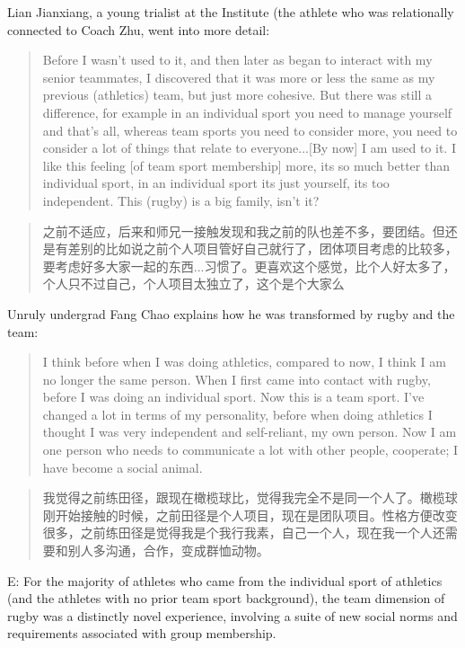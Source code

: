 \begin{CJK}{UTF8}{gbsn}
Lian Jianxiang, a young trialist at the Institute (the athlete who was relationally connected to Coach Zhu, went into more detail:
       \begin{quote}
           Before I wasn’t used to it, and then later as began to interact with my senior teammates, I discovered that it was more or less the same as my previous (athletics) team, but just more cohesive.  But there was still a difference, for example in an individual sport you need to manage yourself and that's all, whereas team sports you need to consider more, you need to consider a lot of things that relate to everyone...[By now] I am used to it. I like this feeling [of team sport membership] more, its so much better than individual sport, in an individual sport its just yourself, its too independent. This (rugby) is a big family, isn’t it?
       \end{quote}
       \begin{quote}
              之前不适应，后来和师兄一接触发现和我之前的队也差不多，要团结。但还是有差别的比如说之前个人项目管好自己就行了，团体项目考虑的比较多，要考虑好多大家一起的东西...习惯了。更喜欢这个感觉，比个人好太多了，个人只不过自己，个人项目太独立了，这个是个大家么 \\
        \end{quote}

   Unruly undergrad Fang Chao explains how he was transformed by rugby and the team:

       \begin{quote}
             I think before when I was doing athletics, compared to now, I think I am no longer the same person.  When I first came into contact with rugby, before I was doing an individual sport.  Now this is a team sport. I've changed a lot in terms of my personality, before when doing athletics I thought I was very independent and self-reliant, my own person.  Now I am one person who needs to communicate a lot with other people, cooperate; I have become a social animal.
       \end{quote}
        \begin{quote}
             我觉得之前练田径，跟现在橄榄球比，觉得我完全不是同一个人了。橄榄球刚开始接触的时候，之前田径是个人项目，现在是团队项目。性格方便改变很多，之前练田径是觉得我是个我行我素，自己一个人，现在我一个人还需要和别人多沟通，合作，变成群恤动物。
       \end{quote}
       E: For the majority of athletes who came from the individual sport of athletics (and the athletes with no prior team sport background), the team dimension of rugby was a distinctly novel experience, involving a suite of new social norms and requirements associated with group membership.




\end{CJK}
